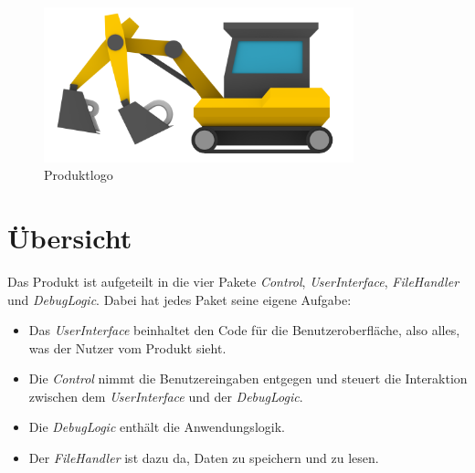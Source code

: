 \documentclass[parskip=full]{scrartcl}
\begin{document}
\vspace{1cm}
\begin{figure}[!h]
\centering
\includegraphics[width=0.8\textwidth]{../Plichtenheft/logo_nongi.png}
\caption{Produktlogo}
\end{figure}

\newpage
\section{Übersicht}
\label{Übersicht}

Das Produkt ist aufgeteilt in die vier Pakete \textit{Control}, \textit{UserInterface}, \textit{FileHandler} und \textit{DebugLogic}. 
Dabei hat jedes Paket seine eigene Aufgabe:
\begin{itemize}
\item Das \textit{UserInterface} beinhaltet den Code für die Benutzeroberfläche, also alles, was der Nutzer vom Produkt sieht.
\item Die \textit{Control} nimmt die Benutzereingaben entgegen und steuert die Interaktion zwischen dem \textit{UserInterface} und der \textit{DebugLogic}.
\item Die \textit{DebugLogic} enthält die Anwendungslogik.
\item Der \textit{FileHandler} ist dazu da, Daten zu speichern und zu lesen.
\end{itemize}
\end{document}
